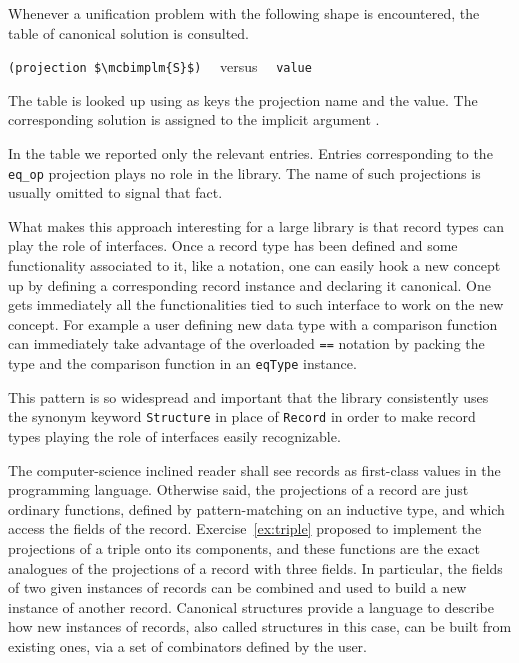 Whenever a unification problem with the following shape is encountered,
the table of canonical solution is consulted.
\begin{center}
\lstinline/(projection $\mcbimplm{S}$)/ ~~versus~~ \lstinline/value/
\end{center}
The table is looked up using as keys the projection name and the
value.  The corresponding solution is assigned to the implicit
argument .

In the table we reported only the relevant entries.  Entries
corresponding to the \lstinline/eq_op/ projection plays no role
in the \mcbMC{} library. The name of such projections is
usually omitted to signal that fact.

What makes this approach interesting for a large library is that
record types can play the role of interfaces.  Once a record type has
been defined and some functionality associated to it, like a notation,
one can easily hook a new concept up by defining a corresponding
record instance and declaring it canonical.  One gets immediately all
the functionalities tied to such interface to work on the new concept.
For example a user defining new data type with a comparison function
can immediately take advantage of the overloaded \lstinline/==/
notation by packing the type and the comparison function in an
\lstinline/eqType/ instance.

This pattern is so widespread and important that the \mcbMC{}
library
consistently uses the synonym keyword \lstinline/Structure/ in place of
\lstinline/Record/ in order to make record types playing the role
of interfaces easily recognizable.

The computer-science inclined reader shall see records as first-class
values in the  \mcbCIC{} programming language. Otherwise said,
the projections of a record are just ordinary functions, defined by
pattern-matching on an inductive type, and which access the fields
of the record. Exercise~\ref{ex:triple} proposed to implement the
projections of a triple onto its components, and these functions are
the exact analogues of the projections of a record with three fields.
In particular,  the fields of two given instances of records can be
combined and used to build a new instance of another record. Canonical
structures provide a language to describe how new instances of
records, also called structures in this case, can
be built from existing ones, via a set of combinators defined by the
user. %

